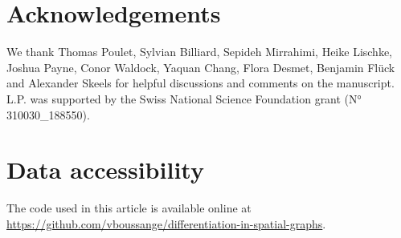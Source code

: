   \section{Acknowledgements}
  We thank Thomas Poulet, Sylvian Billiard, Sepideh Mirrahimi, Heike Lischke, Joshua Payne, Conor Waldock, Yaquan Chang, Flora Desmet, Benjamin Flück and Alexander Skeels for helpful discussions and comments on the manuscript. L.P. was supported by the Swiss National Science Foundation grant (N° 310030\_188550).
  
  \section{Data accessibility}
  The code used in this article is available online at \href{https://github.com/vboussange/differentiation-in-spatial-graphs}{https://github.com/vboussange/differentiation-in-spatial-graphs}.
  
  
  \printbibliography[segment=\therefsegment,heading=subbibliography]